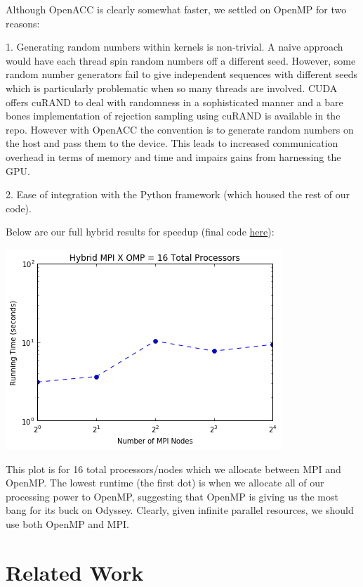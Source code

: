 \documentclass{article}
\begin{document}
Although OpenACC is clearly somewhat faster, we settled on OpenMP for two
reasons:

1. Generating random numbers within kernels is non-trivial. A naive approach
would have each thread spin random numbers off a different seed. However, some
random number generators fail to give independent sequences with different
seeds which is particularly problematic when so many threads are involved. CUDA
offers cuRAND to deal with randomness in a sophisticated manner and a bare
bones implementation of rejection sampling using cuRAND is available in the
repo. However with OpenACC the convention is to generate random numbers on the
host and pass them to the device. This leads to increased communication
overhead in terms of memory and time and impairs gains from harnessing the GPU.

2. Ease of integration with the Python framework (which housed the rest of our
code).

Below are our full hybrid results for speedup (final code
\href{https://github.com/asross/cs205-project/blob/master/odyssey_setup/teleporting_mcmc2}{here}):

\includegraphics[width=\textwidth]{hybrid-results.png}

This plot is for 16 total processors/nodes which we allocate between MPI and
OpenMP. The lowest runtime (the first dot) is when we allocate all of our
processing power to OpenMP, suggesting that OpenMP is giving us the most bang
for its buck on Odyssey. Clearly, given infinite parallel resources, we should
use both OpenMP and MPI.

\section{Related Work}
\end{document}
